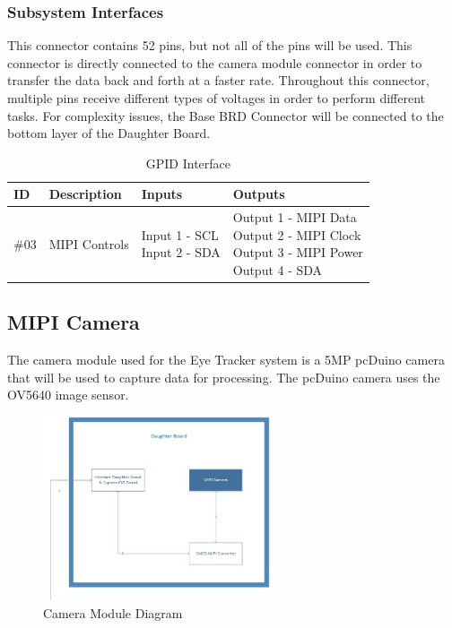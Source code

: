 \subsubsection{Subsystem Interfaces}
This connector contains 52 pins, but not all of the pins will be used. This connector is directly connected to the camera module connector in order to transfer the data back and forth at a faster rate.  Throughout this connector, multiple pins receive different types of voltages in order to perform different tasks. For complexity issues, the Base BRD Connector will be connected to the bottom layer of the Daughter Board.

\begin {table}[H]
\caption {GPID Interface}
\begin{center}
    \begin{tabular}{ | p{1cm} | p{6cm} | p{3cm} | p{3cm} |}
    \hline
    ID & Description & Inputs & Outputs \\ \hline
     \#03 & MIPI Controls & \pbox{3cm}{Input 1 - SCL \\ Input 2 - SDA} & \pbox{3cm}{Output 1 - MIPI Data \\ Output 2 - MIPI Clock \\ Output 3 - MIPI Power \\ Output 4 - SDA}  \\ \hline
    \end{tabular}
\end{center}
\end{table}
\newline

\subsection{MIPI Camera}
The camera module used for the Eye Tracker system is a 5MP pcDuino camera that will be used to capture data for processing. The pcDuino camera uses the OV5640 image sensor.

\begin{figure}[h!]
	\centering
 	\includegraphics[width=0.60\textwidth]{images/DaughterBoard_Camera}
 \caption{Camera Module Diagram}
\end{figure}


